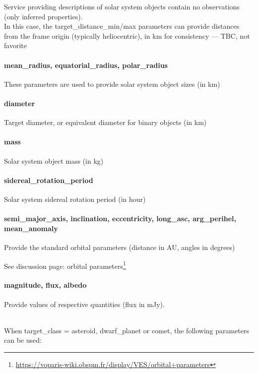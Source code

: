 \documentclass[11pt,a4paper]{ivoa}
\begin{document}
Service providing descriptions of solar system objects contain
no observations (only inferred properties).\\
In this case, the target\_distance\_min/max parameters
can provide distances from the frame origin (typically heliocentric),
in km for consistency --- TBC, not favorite

\paragraph{mean\_radius, equatorial\_radius, polar\_radius}

These parameters are used to provide solar system object sizes (in km)

\paragraph{diameter}

Target diameter, or equivalent diameter for binary objects (in km)

\paragraph{mass}

Solar system object mass (in kg)

\paragraph{sidereal\_rotation\_period}

Solar system sidereal rotation period (in hour)

\paragraph{semi\_major\_axis, inclination, eccentricity, long\_asc, arg\_perihel, mean\_anomaly}

Provide the standard orbital parameters (distance in AU, angles in degrees)

See discussion page: orbital
parameters\footnote{\url{https://voparis-wiki.obspm.fr/display/VES/orbital+parameters}}

\paragraph{magnitude, flux, albedo}
Provide values of respective quantities (flux in mJy).



\textbf{\\}When target\_class = asteroid, dwarf\_planet or comet,
the following parameters can be used:
\end{document}
